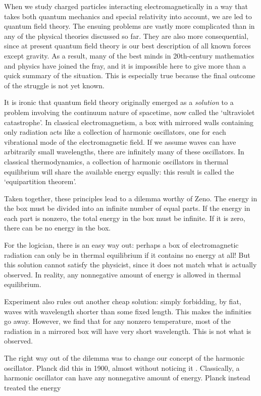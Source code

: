 \documentclass[12pt]{article}
\begin{document}
When we study charged particles interacting electromagnetically in a way that
takes both quantum mechanics and special relativity into account, we are led to
quantum field theory.  The ensuing problems are vastly more complicated than in any of the physical theories discussed so far.  They are also more consequential, since at present quantum field theory is our best description of all known forces except gravity.  As a result, many of the best minds in 20th-century mathematics and physics have joined the fray, and it is impossible here to give more than a quick summary of the situation. This is especially true because the final outcome of the struggle is not yet known.

It is ironic that quantum field theory originally emerged as a \emph{solution} to a problem involving the continuum nature of spacetime, now called the `ultraviolet catastrophe'.  In classical electromagnetism, a box with mirrored walls containing only radiation acts like a collection of harmonic oscillators, one for each vibrational mode of the electromagnetic field.  If we assume waves can have arbitrarily small wavelengths, there are infinitely many of these oscillators.  In classical thermodynamics, a collection of harmonic oscillators in thermal equilibrium will share the available energy equally: this result is called the `equipartition theorem'.  

Taken together, these principles lead to a dilemma worthy of Zeno.  The energy in the box must be divided into an infinite number of equal parts.  If the energy in each part is nonzero, the total energy in the box must be infinite.  If it is zero, there can be no energy in the box.  

For the logician, there is an easy way out: perhaps a box of electromagnetic radiation can only be in thermal equilibrium if it contains no energy at all!   But this solution cannot satisfy the physicist, since it does not match what is actually observed.  In reality, any nonnegative amount of energy is allowed in thermal equilibrium.  

Experiment also rules out another cheap solution: simply forbidding, by fiat, waves with wavelength shorter than some fixed length.  This makes the infinities go away.  However, we find that for any nonzero temperature, most of the radiation in a mirrored box will have very short wavelength.  This is not what is observed.

The right way out of the dilemma was to change our concept of the harmonic oscillator.  Planck did this in 1900, almost without noticing it \cite{Planck}.  Classically, a harmonic oscillator can have any nonnegative amount of energy.  Planck instead treated the energy 
\end{document}
